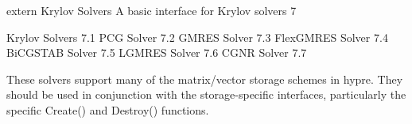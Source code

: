 \documentclass{article}
\begin{document}
\begin{cxxentry}
{extern }
        {Krylov Solvers}
        {}
        {A basic interface for Krylov solvers}
        {7}
\begin{cxxnames}
\cxxitem{}
        {Krylov Solvers}
        {}
        {
}
        {7.1}
\cxxitem{}
        {PCG Solver}
        {}
        {
}
        {7.2}
\cxxitem{}
        {GMRES Solver}
        {}
        {
}
        {7.3}
\cxxitem{}
        {FlexGMRES Solver}
        {}
        {
}
        {7.4}
\cxxitem{}
        {BiCGSTAB Solver}
        {}
        {
}
        {7.5}
\cxxitem{}
        {LGMRES Solver}
        {}
        {
}
        {7.6}
\cxxitem{}
        {CGNR Solver}
        {}
        {
}
        {7.7}
\end{cxxnames}
\begin{cxxdoc}


These solvers support many of the matrix/vector storage schemes in hypre.
They should be used in conjunction with the storage-specific interfaces,
particularly the specific Create() and Destroy() functions.



\end{cxxdoc}
\end{cxxentry}
\end{document}
